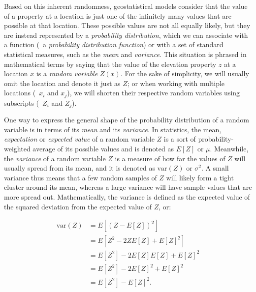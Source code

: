 Based on this inherent randomness, geostatistical models consider that the value of a property at a location is just one of the infinitely many values that are possible at that location.
These possible values are not all equally likely, but they are instead represented by a \emph{probability distribution}, which we can associate with a function (\ie\ a \emph{probability distribution function}) or with a set of standard statistical measures, such as the \emph{mean} and \emph{variance}.
This situation is phrased in mathematical terms by saying that the value of the elevation property \(z\) at a location \(x\) is a \emph{random variable} \(Z(x)\).
For the sake of simplicity, we will usually omit the location and denote it just as \(Z\); or when working with multiple locations (\eg\ \(x_i\) and \(x_j\)), we will shorten their respective random variables using subscripts (\eg\ \(Z_i\) and \(Z_j\)).

One way to express the general shape of the probability distribution of a random variable is in terms of its \emph{mean} and its \emph{variance}.
In statistics, the mean, \emph{expectation} or \emph{expected value} of a random variable \(Z\) is a sort of probability-weighted average of its possible values and is denoted as \(E[Z]\) or \(\mu\).
Meanwhile, the \emph{variance} of a random variable \(Z\) is a measure of how far the values of \(Z\) will usually spread from its mean, and it is denoted as \(\mathrm{var}(Z)\) or \(\sigma^2\).
A small variance thus means that a few random samples of \(Z\) will likely form a tight cluster around its mean, whereas a large variance will have sample values that are more spread out.
Mathematically, the variance is defined as the expected value of the squared deviation from the expected value of \(Z\), or:

\begin{align}
\mathrm{var}(Z) &= E\left[{\left(Z-E\left[Z\right]\right)}^2\right] \label{eq:variance1} \\
&= E\left[Z^2 -2ZE\left[Z\right] + E[Z]^2\right] \nonumber \\
&= E\left[Z^2\right] - 2E\left[Z\right]E\left[Z\right] + E\left[Z\right]^2 \nonumber \\
&= E\left[Z^2\right] - 2E\left[Z\right]^2 + E\left[Z\right]^2 \nonumber \\
&= E\left[Z^2\right]-{E[Z]}^2. \label{eq:variance2}
\end{align}

